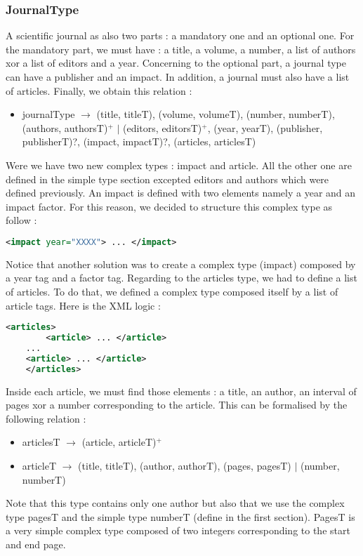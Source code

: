 \documentclass{article}
\begin{document}
\subsubsection{JournalType}
A scientific journal as also two parts : a mandatory one and an optional one. For the mandatory part, we must have : a title, a volume, a number, a list of authors xor a list of editors and a year. Concerning to the optional part, a journal type can have a publisher and an impact. In addition, a journal must also have a list of articles. Finally, we obtain this relation :
\begin{itemize}
\item journalType $\rightarrow$ (title, titleT), (volume, volumeT), (number, numberT), (authors, authorsT)$^+$ $|$ (editors, editorsT)$^+$, (year, yearT), (publisher, publisherT)?, (impact, impactT)?, (articles, articlesT)
\end{itemize}
Were we have two new complex types : impact and article. All the other one are defined in the simple type section excepted editors and authors which were defined previously. An impact is defined with two elements namely a year and an impact factor. For this reason, we decided to structure this complex type as follow :
\begin{lstlisting}[language=XML]
    <impact year="XXXX"> ... </impact>
\end{lstlisting}
Notice that another solution was to create a complex type (impact) composed by a year tag and a factor tag. Regarding to the articles type, we had to define a list of articles. To do that, we defined a complex type composed itself by a list of article tags. Here is the XML logic : 
\begin{lstlisting}[language=XML]
    <articles>  
    	<article> ... </article>
	...
	<article> ... </article>
    </articles>
\end{lstlisting}
Inside each article, we must find those elements : a title, an author, an interval of pages xor a number corresponding to the article. This can be formalised by the following relation : 
\begin{itemize}
\item articlesT $\rightarrow$ (article, articleT)$^+$
\item articleT $\rightarrow$ (title, titleT), (author, authorT), (pages, pagesT) $|$ (number, numberT)
\end{itemize}
Note that this type contains only one author but also that we use the complex type pagesT and the simple type numberT (define in the first section). PagesT is a very simple complex type composed of two integers corresponding to the start and end page.
\end{document}
